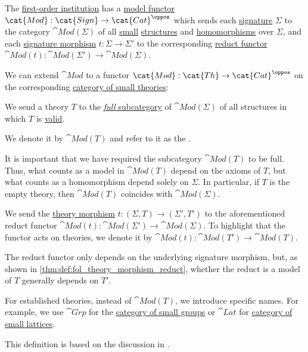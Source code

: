 \begin{definition}\label{def:fol_theory_model_functor}\mimprovised
  The \hyperref[def:fol_institution]{first-order institution} has a \hyperref[def:fol_institution/models]{model functor} \( \cat{Mod}: \cat{Sign} \to \cat{Cat}^\oppos \) which sends each \hyperref[def:fol_signature]{signature} \( \Sigma \) to the category \( \cat{Mod}(\Sigma) \) of all \hyperref[def:small_set]{small} \hyperref[def:fol_structure]{structures} and \hyperref[def:fol_homomorphism]{homomorphisms} over \( \Sigma \), and each \hyperref[def:fol_signature_category/morphisms]{signature morphism} \( t: \Sigma \to \Sigma' \) to the corresponding \hyperref[def:fol_institution/models/hom]{reduct functor} \( \cat{Mod}(t): \cat{Mod}(\Sigma') \to \cat{Mod}(\Sigma) \).

  We can extend \( \cat{Mod} \) to a functor \( \cat{Mod}: \cat{Th} \to \cat{Cat}^\oppos \) on the corresponding \hyperref[def:fol_theory/category]{category of small theories}:
  \begin{thmenum}
     We send a theory \( T \) to the \hyperref[def:subcategory/full]{\emph{full} subcategory} of \( \cat{Mod}(\Sigma) \) of all structures in which \( T \) is \hyperref[def:fol_semantics/model]{valid}.

    We denote it by \( \cat{Mod}(T) \) and refer to it as the .

    It is important that we have required the subcategory \( \cat{Mod}(T) \) to be full. Thus, what counts as a model in \( \cat{Mod}(T) \) depend on the axioms of \( T \), but what counts as a homomorphism depend solely on \( \Sigma \). In particular, if \( T \) is the empty theory, then \( \cat{Mod}(T) \) coincides with \( \cat{Mod}(\Sigma) \).

     We send the \hyperref[def:fol_theory/morphism]{theory morphism} \( t: (\Sigma, T) \to (\Sigma', T') \) to the aforementioned reduct functor \( \cat{Mod}(t): \cat{Mod}(\Sigma') \to \cat{Mod}(\Sigma) \). To highlight that the functor acts on theories, we denote it by \( \cat{Mod}(t): \cat{Mod}(T') \to \cat{Mod}(T) \).

    The reduct functor only depends on the underlying signature morphism, but, as shown in \cref{thm:def:fol_theory_morphism_reduct}, whether the reduct is a model of \( T \) generally depends on \( T' \).
  \end{thmenum}
\end{definition}
\begin{comments}
  \item For established theories, instead of \( \cat{Mod}(T) \), we introduce specific names. For example, we use \( \cat{Grp} \) for the \hyperref[def:group/category]{category of small groups} or \( \cat{Lat} \) for \hyperref[def:lattice/theory]{category of small lattices}.

  \item This definition is based on the discussion in \cite[105]{GoguenBurstall1992Institutions}.
\end{comments}

